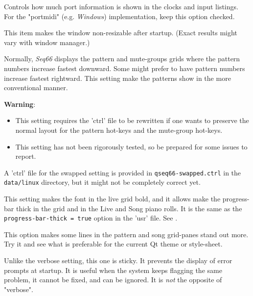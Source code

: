    Controls how much port information is shown in the clocks and input
   listings.  For the "portmidi" (e.g. \textsl{Windows})
   implementation, keep this option checked.

   This item makes the window non-resizable after startup.
   (Exact results might vary with window manager.)

   Normally, \textsl{Seq66} displays the pattern and mute-groups grids
   where the pattern numbers increase fastest downward.
   Some might prefer to have pattern numbers increase fastest rightward.
   This setting make the patterns show in the more conventional manner.

   \textbf{Warning}:

      \begin{itemize}
         \item This setting requires the 'ctrl' file to be rewritten
            if one wants to preserve the normal layout for the pattern hot-keys
            and the mute-group hot-keys.
         \item This setting has not been rigorously tested, so be prepared for
            some issues to report.
      \end{itemize}

   A 'ctrl' file for the swapped setting is provided
   in \texttt{qseq66-swapped.ctrl} in the \texttt{data/linux}
   directory, but it might not be completely correct yet.

   This setting makes the font in the live grid bold, and it allows
   make the progress-bar thick in the grid and in the Live and Song piano
   rolls.
   It is the same as the \texttt{progress-bar-thick = true} option in the 'usr'
   file. See .

   This option makes some lines in the pattern and song grid-panes
   stand out more. Try it and see what is preferable for the current
   Qt theme or style-sheet.

   Unlike the verbose setting, this one is sticky.
   It prevents the display of error prompts at startup.
   It is useful when the system keeps flagging the same problem,
   it cannot be fixed, and can be ignored.
   It is \textsl{not} the opposite of "verbose".

